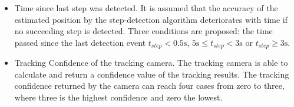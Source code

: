 \documentclass[engproc,conferenceproceedings,submit,pdftex,moreauthors]{Definitions/mdpi}
\begin{document}
\begin{itemize}
	\item Time since last step was detected. It is assumed that the accuracy of the estimated position by the step-detection algorithm deteriorates with time if no succeeding step is detected. Three conditions are proposed: the time passed since the last detection event $t_{step} < 0.5\mathrm{s}$, $5\mathrm{s} \leq t_{step} < 3\mathrm{s}$ or $t_{step} \geq 3\mathrm{s}$.\\
	
	\item Tracking Confidence of the tracking camera. The tracking camera is able to calculate and return a confidence value of the tracking results. The tracking confidence returned by the camera can reach four cases from zero to three, where three is the highest confidence and zero the lowest.
\end{itemize}
\end{document}
